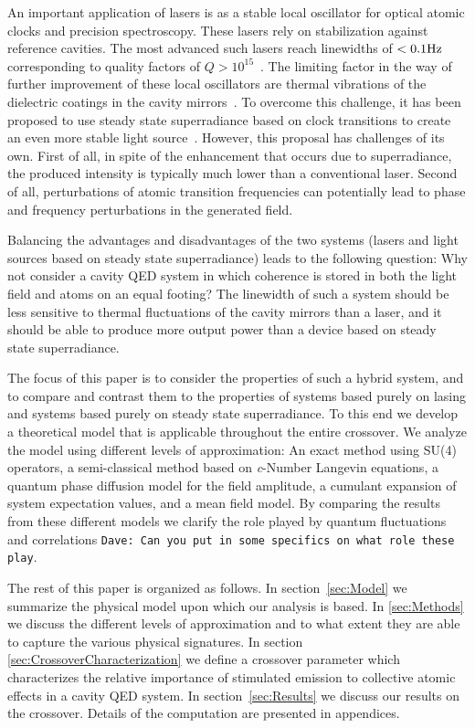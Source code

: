 \documentclass[aps,
twocolumn,
superscriptaddress,groupedaddress]{revtex4}
\newcommand{\dmcomment}[1]{{\tt #1}}
\begin{document}
An important application of lasers is as a stable local oscillator for
optical atomic clocks and precision spectroscopy.  These lasers rely
on stabilization against reference cavities.  The most advanced such
lasers reach linewidths of $< 0.1 {\rm Hz}$ corresponding to quality
factors of $Q>10^{15}$~\cite{Cole:TenfoldReductionBrownianNoise}.  The
limiting factor in the way of further improvement of these local
oscillators are thermal vibrations of the dielectric coatings in the
cavity mirrors~\cite{PhysRevLett.101.260602}.  To overcome this
challenge, it has been proposed to use steady state superradiance based
on clock transitions to create an even more stable light
source~\cite{PhysRevLett.102.163601, ChenDeliciousLaser}.  However,
this proposal has challenges of its own.  First of all, in spite of the
enhancement that occurs due to superradiance, the produced intensity is
typically much lower than a conventional laser.  Second of all,
perturbations of atomic transition frequencies can potentially lead to
phase and frequency perturbations in the generated field.

Balancing the advantages and disadvantages of the two systems (lasers
and light sources based on steady state superradiance) leads to the
following question: Why not consider a cavity QED system in which
coherence is stored in both the light field and atoms on an equal
footing? The linewidth of such a system should be less sensitive to
thermal fluctuations of the cavity mirrors than a laser, and it should
be able to produce more output power than a device based on steady state
superradiance.

The focus of this paper is to consider the properties of such a hybrid
system, and to compare and contrast them to the properties of systems
based purely on lasing and systems based purely on steady state
superradiance.  To this end we develop a theoretical model that is
applicable throughout the entire crossover.  We analyze the model using
different levels of approximation: An exact method using SU(4)
operators, a semi-classical method based on {\it c}-Number Langevin
equations, a quantum phase diffusion model for the field amplitude, a
cumulant expansion of system expectation values, and a mean field model.
By comparing the results from these different models we clarify the
role played by quantum fluctuations and correlations \dmcomment{Dave: Can
you put in some specifics on what role these play}.

The rest of this paper is organized as follows.  In section~\ref{sec:Model}
we summarize the physical model upon which our analysis is based. In
\ref{sec:Methods} we discuss the different levels of approximation
and to what extent they are able to capture the various physical
signatures. In section \ref{sec:CrossoverCharacterization} we define a crossover parameter which characterizes the relative importance of stimulated emission to collective atomic effects in a cavity QED system. In section~\ref{sec:Results} we discuss our results on the crossover.  Details of the computation are presented in appendices.
\end{document}
